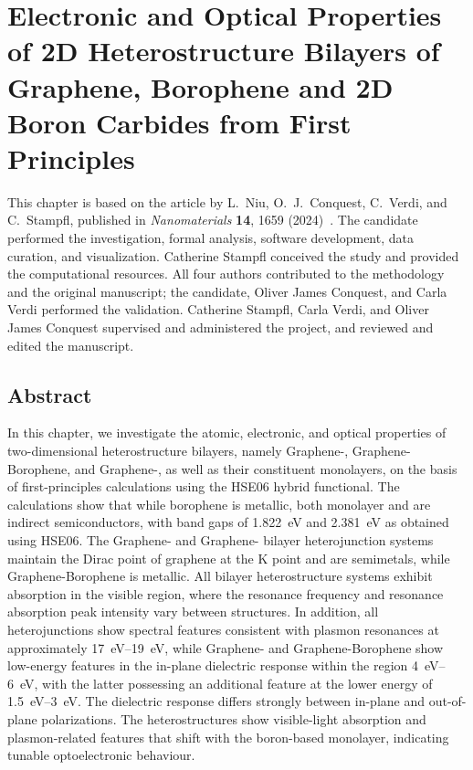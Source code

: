 \chapter[Optoelectronics of Carbon-Boron Heterostructures]{Electronic and Optical Properties of 2D Heterostructure Bilayers of Graphene, Borophene and 2D Boron Carbides from First Principles}
\label{cha:project_bilayers}

This chapter is based on the article by L.~Niu, O.~J.~Conquest, C.~Verdi, and C.~Stampfl,
published in \textit{Nanomaterials} \textbf{14}, 1659 (2024)~\cite{niu2024electronic}.
The candidate performed the investigation, formal analysis, software development, data curation, and visualization.
Catherine Stampfl conceived the study and provided the computational resources.
All four authors contributed to the methodology and the original manuscript;
the candidate, Oliver James Conquest, and Carla Verdi performed the validation.
Catherine Stampfl, Carla Verdi, and Oliver James Conquest supervised and administered the project, and reviewed and edited the manuscript.

\section{Abstract}
\label{1_abstract}

In this chapter,
we investigate the atomic, electronic, and optical properties of two-dimensional heterostructure bilayers,
namely Graphene-, Graphene-Borophene, and Graphene-,
as well as their constituent monolayers, on the basis of first-principles calculations using the HSE06 hybrid functional.
The calculations show that while borophene is metallic,
both monolayer  and  are indirect semiconductors,
with band gaps of \qty{1.822}{\electronvolt} and \qty{2.381}{\electronvolt} as obtained using HSE06.
The Graphene- and Graphene- bilayer heterojunction systems maintain the Dirac point of graphene at the $\mathrm{K}$ point and are semimetals,
while Graphene-Borophene is metallic.
All bilayer heterostructure systems exhibit absorption in the visible region, where the resonance frequency and resonance absorption peak intensity vary between structures.
In addition, all heterojunctions show spectral features consistent with plasmon resonances at approximately \qtyrange{17}{19}{\electronvolt}, while Graphene- and Graphene-Borophene show low-energy features in the in-plane dielectric response within the region \qtyrange{4}{6}{\electronvolt},
with the latter possessing an additional feature at the lower energy of \qtyrange{1.5}{3}{\electronvolt}.
The dielectric response differs strongly between in-plane and out-of-plane polarizations.
The heterostructures show visible-light absorption and plasmon-related features that shift with the boron-based monolayer, indicating tunable optoelectronic behaviour.

